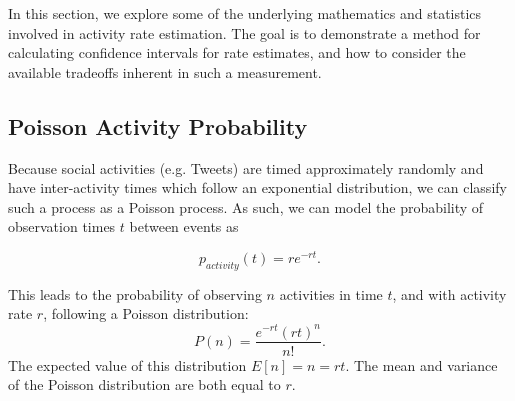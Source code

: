 \documentclass{article}
\begin{document}
In this section, we explore some of the underlying mathematics and statistics involved in 
activity rate estimation. The goal is to demonstrate a method for calculating confidence 
intervals for rate estimates, and how to consider the available tradeoffs inherent in such 
a measurement.


\subsection{Poisson Activity Probability} 
\label{poisson}

Because 
\reversemarginpar\marginpar{\raggedleft
%
    \begin{tikzpicture}[scale=0.26]]
\draw [red, very thick, rotate around={60: (0, 0)}] (-0.7, -0.7) rectangle(0.7, 0.7);
%
\draw [very thick, <->] (0.25000000000000006, 0.4330127018922193) -- (1.25, 2.165063509461097) ;
\draw [very thick, <->] (1.75, 2.165063509461097) -- (2.75, 0.4330127018922193) ;
\draw [very thick, <->] (2.5, 0) -- (0.5, 0) ;
%
\draw [orange, ultra thick] (0,0) circle [radius= 0.5 ];
\draw [yellow, ultra thick] ( 1.5 , 2.59807621135 ) circle [radius= 0.5 ];
\draw [green,  ultra thick] ( 3.0 , 0 ) circle [radius= 0.5 ];
    \end{tikzpicture}
%
%
}
social activities (e.g. Tweets) are timed approximately randomly and have inter-activity 
times which follow an exponential distribution, we can classify such a process as a Poisson 
process. As such, we can model the probability of observation times $t$ between events as 

\begin{equation}
    \label{eq:tbe}
    p_{activity}(t) = r e^{-r t}.
\end{equation}

This leads to the probability of observing $n$ activities in time $t$, and with activity rate $r$, 
following a Poisson distribution:
\begin{equation}
    \label{eq:poisson}
    P(n) = \frac{e^{-r t} (r t)^n}{n!}.
\end{equation}
The expected value of this distribution $E[n]=n=rt$. The mean and variance of the Poisson distribution are 
both equal to $r$\cite{tbd}.
\end{document}
